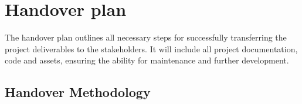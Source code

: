 \section{Handover plan}
\label{section:handover_plan}

The handover plan outlines all necessary steps for successfully transferring the project deliverables to the stakeholders. It will include all project documentation, code and assets, ensuring the ability for maintenance and further development. 

\subsection{Handover Methodology}

